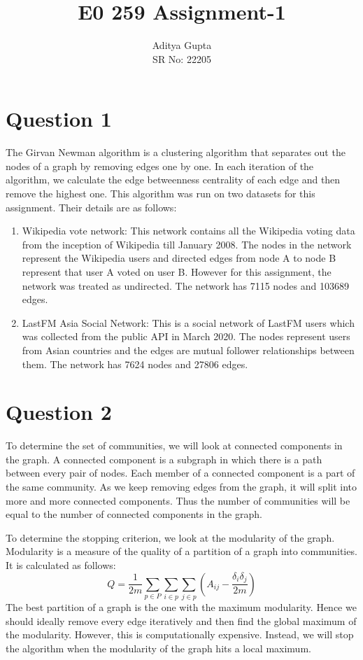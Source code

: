\documentclass[12pt]{article}
\title{\vspace{-1.5cm}E0 259 Assignment-1}
\author{Aditya Gupta \\
SR No: 22205}
\date{}
\begin{document}
\maketitle

\section*{Question 1}
The Girvan Newman algorithm is a clustering algorithm that separates out the nodes of a graph by removing edges one by one. In each iteration of the algorithm, we calculate the edge betweenness centrality of each edge and then remove the highest one. This algorithm was run on two datasets for this assignment. Their details are as follows:
\begin{enumerate}
    \item Wikipedia vote network: This network contains all the Wikipedia voting data from the inception of Wikipedia till January 2008. The nodes in the network represent the Wikipedia users and directed edges from node A to node B represent that user A voted on user B. However for this assignment, the network was treated as undirected. The network has 7115 nodes and 103689 edges.
    
    \item LastFM Asia Social Network: This is a social network of LastFM users which was collected from the public API in March 2020. The nodes represent users from Asian countries and the edges are mutual follower relationships between them. The network has 7624 nodes and 27806 edges.  
\end{enumerate}


\section*{Question 2}
To determine the set of communities, we will look at connected components in the graph. A connected component is a subgraph in which there is a path between every pair of nodes. Each member of a connected component is a part of the same community. As we keep removing edges from the graph, it will split into more and more connected components. Thus the number of communities will be equal to the number of connected components in the graph.

To determine the stopping criterion, we look at the modularity of the graph. Modularity is a measure of the quality of a partition of a graph into communities. It is calculated as follows:
\begin{equation}
    Q = \frac{1}{2m} \sum_{p \in P} \sum_{i \in p} \sum_{j \in p} \left( A_{ij} - \frac{\delta_i \delta_j}{2m} \right)
\end{equation}
The best partition of a graph is the one with the maximum modularity. Hence we should ideally remove every edge iteratively and then find the global maximum of the modularity. However, this is computationally expensive. Instead, we will stop the algorithm when the modularity of the graph hits a local maximum.
\end{document}

